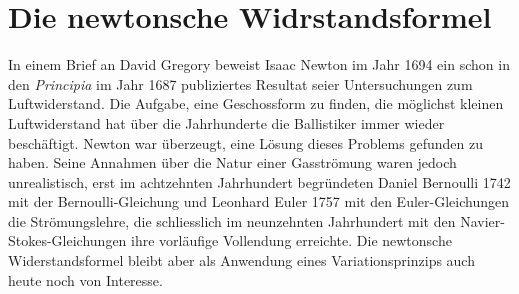 %
%
%
%
\chapter{Die newtonsche Widrstandsformel\label{chapter:widerstand}}
\begin{refsection}

In einem Brief an David Gregory beweist Isaac Newton im Jahr 1694
ein schon in den {\em Principia} \cite{widerstand:principia}
im Jahr 1687 publiziertes Resultat seier Untersuchungen zum
Luftwiderstand.
Die Aufgabe, eine Geschossform zu finden, die möglichst kleinen
Luftwiderstand hat über die Jahrhunderte die Ballistiker immer 
wieder beschäftigt.
Newton war überzeugt, eine Lösung dieses Problems gefunden zu haben.
Seine Annahmen über die Natur einer Gasströmung waren jedoch 
unrealistisch, erst im achtzehnten Jahrhundert begründeten
Daniel Bernoulli 1742 mit der Bernoulli-Gleichung und Leonhard Euler
1757 mit den Euler-Gleichungen die Strömungslehre, die schliesslich im
neunzehnten Jahrhundert mit den Navier-Stokes-Gleichungen ihre
vorläufige Vollendung erreichte.
Die newtonsche Widerstandsformel bleibt aber als Anwendung eines
Variationsprinzips auch heute noch von Interesse.




\printbibliography[heading=subbibliography]
\end{refsection}
